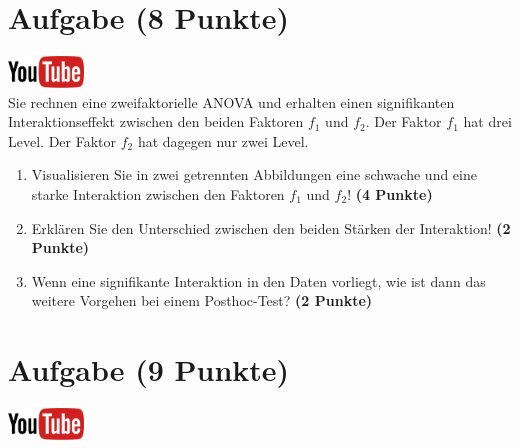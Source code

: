 \documentclass[a4paper, 9pt]{scrartcl}\usepackage[]{graphicx}\usepackage[]{xcolor}
\begin{document}
 
\clearpage

\section{Aufgabe \hfill (8 Punkte)}

\hfill\href{https://youtu.be/2qG1Dws0MJo}{\includegraphics[width =
  2cm]{img/youtube}}\\[1Ex]


Sie rechnen eine zweifaktorielle ANOVA und erhalten einen signifikanten
Interaktionseffekt zwischen den beiden Faktoren $f_1$ und $f_2$. Der Faktor
$f_1$ hat drei Level. Der Faktor $f_2$ hat dagegen nur zwei Level.




\begin{enumerate}
\item Visualisieren Sie in zwei getrennten Abbildungen 
  eine schwache und eine starke Interaktion zwischen
  den Faktoren $f_1$ und $f_2$! \textbf{(4 Punkte)}
\item Erkl{\"a}ren Sie den Unterschied zwischen den beiden St{\"a}rken der Interaktion!
  \textbf{(2 Punkte)}
\item Wenn eine signifikante Interaktion in den Daten vorliegt, wie ist
  dann das weitere Vorgehen bei einem Posthoc-Test? 
  \textbf{(2 Punkte)}
\end{enumerate}

 
\clearpage

\section{Aufgabe \hfill (9 Punkte)}

\hfill\href{https://youtu.be/M9Uhm67ndxM}{\includegraphics[width =
  2cm]{img/youtube}}\\[1Ex]
\end{document}
